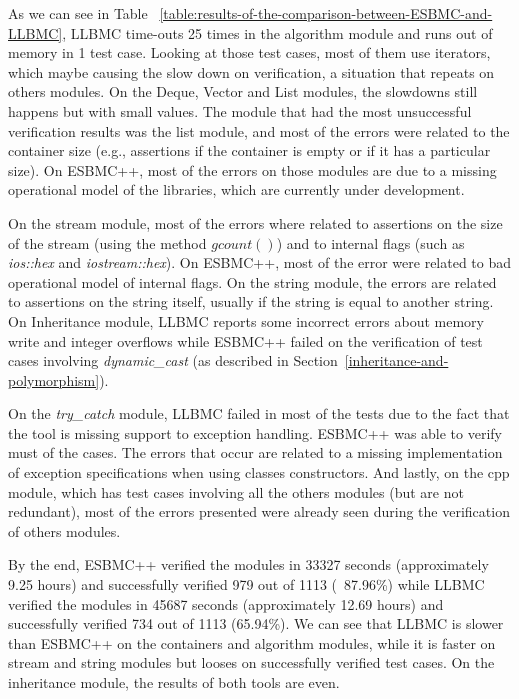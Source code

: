 \documentclass[a4paper]{llncs}
\begin{document}
As we can see in Table ~\ref{table:results-of-the-comparison-between-ESBMC-and-LLBMC},
LLBMC time-outs 25 times in the algorithm module and runs out of memory in 1 test case.
Looking at those test cases, most of them use iterators, which maybe causing the slow down
on verification, a situation that repeats on others modules. On the Deque, Vector and List modules,
the slowdowns still happens but with small values. The module that had the most unsuccessful verification
results was the list module, and most of the errors were related to the container size
(e.g., assertions if the container is empty or if it has a particular size).
On ESBMC++, most of the errors on those modules are due to a missing operational model
of the libraries, which are currently under development.

On the stream module, most of the errors where related to assertions on the size
of the stream (using the method $gcount\left(\right)$) and to internal flags (such as
\textit{ios::hex} and \textit{iostream::hex}). On ESBMC++, most of the error were related
to bad operational model of internal flags. On the string module, the errors are related
to assertions on the string itself, usually if the string is equal to another string.
On Inheritance module, LLBMC reports some incorrect errors about memory write and
integer overflows while ESBMC++ failed on the verification of test cases involving
\textit{dynamic\_cast} (as described in Section~\ref{inheritance-and-polymorphism}).

On the \textit{try\_catch} module, LLBMC failed in most of the tests due to the fact that
the tool is missing support to exception handling. ESBMC++ was able to verify must of the cases.
The errors that occur are related to a missing implementation of exception specifications when
using classes constructors. And lastly, on the cpp module, which has test cases involving all
the others modules (but are not redundant), most of the errors presented were already seen during
the verification of others modules.

By the end, ESBMC++ verified the modules in 33327 seconds (approximately 9.25 hours) and successfully
verified 979 out of 1113 (~87.96\%) while LLBMC verified the modules in 45687 seconds (approximately 12.69 hours)
and successfully verified 734 out of 1113 (65.94\%). We can see that LLBMC is slower than ESBMC++ on the containers
and algorithm modules, while it is faster on stream and string modules but looses on successfully verified test cases.
On the inheritance module, the results of both tools are even.
\end{document}
